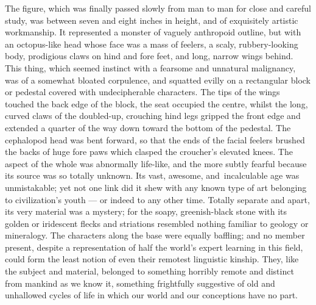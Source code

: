 The figure, which was finally passed slowly from man to man for close
and careful study, was between seven and eight inches in height, and of
exquisitely artistic workmanship. It represented a monster of vaguely
anthropoid outline, but with an octopus-like head whose face was a mass
of feelers, a scaly, rubbery-looking body, prodigious claws on hind and
fore feet, and long, narrow wings behind. This thing, which seemed
instinct with a fearsome and unnatural malignancy, was of a somewhat
bloated corpulence, and squatted evilly on a rectangular block or
pedestal covered with undecipherable characters. The tips of the wings
touched the back edge of the block, the seat occupied the centre, whilst
the long, curved claws of the doubled-up, crouching hind legs gripped
the front edge and extended a quarter of the way down toward the bottom
of the pedestal. The cephalopod head was bent forward, so that the ends
of the facial feelers brushed the backs of huge fore paws which clasped
the croucher's elevated knees. The aspect of the whole was abnormally
life-like, and the more subtly fearful because its source was so totally
unknown. Its vast, awesome, and\est\ incalculable age was unmistakable; yet
not one link did it shew with any known type of art belonging to
civilization's youth --- or indeed to any other time. Totally separate and
apart, its very material was a mystery; for the soapy, greenish-black
stone with its golden or iridescent flecks and striations resembled
nothing familiar to geology or mineralogy. The characters along the base
were equally baffling; and no member present, despite a representation
of half the world's expert learning in this field, could form the least
notion of even their remotest linguistic kinship. They, like the subject
and material, belonged to something horribly remote and distinct from
mankind as we know it, something frightfully suggestive of old and
unhallowed cycles of life in which our world and our conceptions have no
part.

